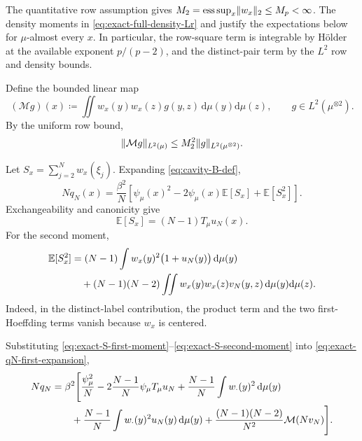 \documentclass[11pt,reqno]{amsart}
\numberwithin{equation}{section}
\theoremstyle{plain}
\theoremstyle{remark}
\DeclarePairedDelimiter{\norm}{\lVert}{\rVert}
\newcommand{\md}{\mathrm{d}}
\newcommand{\E}{{\mathbb{E}}}
\newcommand{\be}{\beta}
\begin{document}
The quantitative row assumption gives $M_2=\operatorname*{ess\,sup}_x\norm{w_x}_2\leq M_p<\infty$.  The density moments in \eqref{eq:exact-full-density-Lr} and  justify the expectations below for $\mu$-almost every $x$.  In particular, the row-square term is integrable by H\"older at the available exponent $p/(p-2)$, and the distinct-pair term by the $L^2$ row and density bounds.


Define the bounded linear map
\begin{equation}\label{eq:exact-M-map}
 (\mathcal M g)(x)
 \coloneqq
 \iint w_x(y)w_x(z)g(y,z)\,\md\mu(y)\md\mu(z),
 \qquad g\in L^2(\mu^{\otimes2}).
\end{equation}
By the uniform row bound,
\begin{equation}\label{eq:exact-riesz-M-bounded}
 \norm{\mathcal M g}_{L^2(\mu)}
 \leq M_2^2\norm{g}_{L^2(\mu^{\otimes2})}.
\end{equation}

Let $S_x=\sum_{j=2}^Nw_x(\xi_j)$.  Expanding \eqref{eq:cavity-B-def},
\begin{equation}\label{eq:exact-qN-first-expansion}
 Nq_N(x)
 =\frac{\be^2}{N}
 \left[
 \psi_\mu(x)^2
 -2\psi_\mu(x)\E[S_x]
 +\E[S_x^2]
 \right].
\end{equation}
Exchangeability and canonicity give
\begin{equation}\label{eq:exact-S-first-moment}
 \E[S_x]=(N-1)T_\mu u_N(x).
\end{equation}
For the second moment,
\begin{align}
 \E[S_x^2]
 &=(N-1)\int w_x(y)^2\big(1+u_N(y)\big)\,\md\mu(y)
 \notag\\
 &\quad+(N-1)(N-2)
 \iint w_x(y)w_x(z)v_N(y,z)\,\md\mu(y)\md\mu(z).
 \label{eq:exact-S-second-moment}
\end{align}
Indeed, in the distinct-label contribution, the product term and the two first-Hoeffding terms vanish because $w_x$ is centered.

Substituting \eqref{eq:exact-S-first-moment}--\eqref{eq:exact-S-second-moment} into \eqref{eq:exact-qN-first-expansion},
\begin{align}
 Nq_N
 &=\be^2\Bigg[
 \frac{\psi_\mu^2}{N}
 -2\frac{N-1}{N}\psi_\mu T_\mu u_N
 +\frac{N-1}{N}\int w_{\cdot}(y)^2\,\md\mu(y)
 \notag\\
 &\qquad
 +\frac{N-1}{N}\int w_{\cdot}(y)^2u_N(y)\,\md\mu(y)
 +\frac{(N-1)(N-2)}{N^2}\mathcal M(Nv_N)
 \Bigg].
 \label{eq:exact-qN-complete-expansion}
\end{align}
\end{document}
